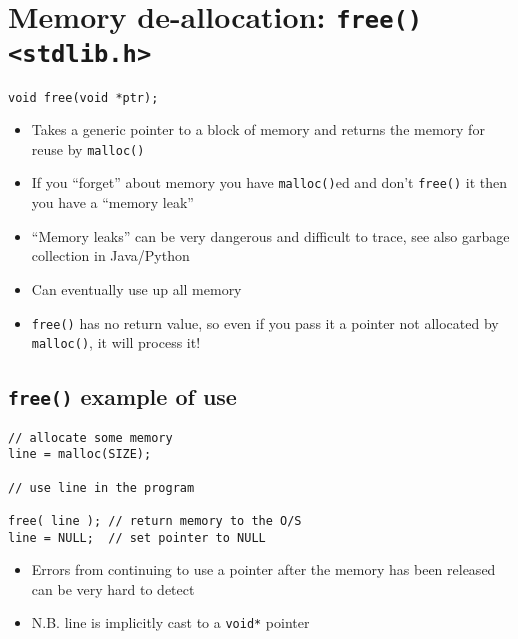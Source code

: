 \documentclass{article}
\begin{document}
\section{Memory de-allocation: \texttt{free() <stdlib.h>}}
\begin{verbatim}
void free(void *ptr);
\end{verbatim}

\begin{itemize}
\item Takes a generic pointer to a block of memory and returns the memory for reuse by \verb!malloc()!

\item If you ``forget'' about memory you have \verb!malloc()!ed and don't \verb!free()! it then you have a ``memory leak''

\item ``Memory leaks'' can be very dangerous and difficult to trace, see also garbage collection in Java/Python
\item Can eventually use up all memory

\item \verb!free()! has no return value, so even if you pass it a pointer not allocated by \verb!malloc()!, it will process it!
\end{itemize}



\subsection{\texttt{free()} example of use}
\begin{verbatim}
// allocate some memory
line = malloc(SIZE);

// use line in the program 

free( line ); // return memory to the O/S
line = NULL;  // set pointer to NULL
\end{verbatim}

\begin{itemize}
\item Errors from continuing to use a pointer after the memory has been released can be very hard to detect

\item N.B. line is implicitly cast to a \verb!void*! pointer
\end{itemize}
\end{document}

